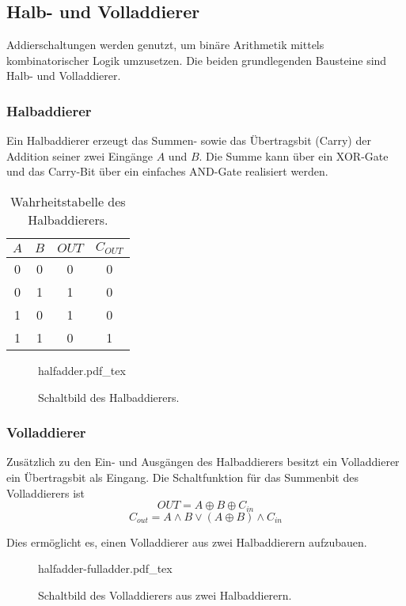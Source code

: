 \subsection{Halb- und Volladdierer}

Addierschaltungen werden genutzt, um binäre Arithmetik mittels kombinatorischer Logik umzusetzen. Die beiden grundlegenden Bausteine sind Halb- und Volladdierer.

\subsubsection{Halbaddierer}
Ein Halbaddierer erzeugt das Summen- sowie das Übertragsbit (Carry) der Addition seiner zwei Eingänge $A$ und $B$.
Die Summe kann über ein XOR-Gate und das Carry-Bit über ein einfaches AND-Gate realisiert werden.


\begin{table}[H]
\centering
 \begin{tabular}{|c|c|c|c|}
  \hline
    $A$ & $B$ & $OUT$ & $C_{OUT}$ \\\hline
    0 & 0 & 0 & 0\\\hline
    0 & 1 & 1 & 0\\\hline
    1 & 0 & 1 & 0\\\hline
    1 & 1 & 0 & 1\\\hline
  \end{tabular}
  \caption{Wahrheitstabelle des Halbaddierers.}
\end{table}

\begin{figure}[H]
  \def\svgwidth{0.382\textwidth}\normalsize
  \begin{center}
     {halfadder.pdf_tex}
  \end{center}
  \caption{Schaltbild des Halbaddierers.}
  \label{fig:halfadder}
\end{figure}


\subsubsection{Volladdierer}
Zusätzlich zu den Ein- und Ausgängen des Halbaddierers besitzt ein Volladdierer ein Übertragsbit als Eingang. Die Schaltfunktion für das Summenbit des Volladdierers ist
\[
  OUT = A \oplus B \oplus C_{in}
\]
\[
  C_{out} = A \land B \lor (A \oplus B) \land C_{in}
\]

Dies ermöglicht es, einen Volladdierer aus zwei Halbaddierern aufzubauen.

\begin{figure}[H]
  \def\svgwidth{\textwidth}\normalsize
  \begin{center}
     {halfadder-fulladder.pdf_tex}
  \end{center}
  \caption{Schaltbild des Volladdierers aus zwei Halbaddierern.}
  \label{fig:fulladder-1}
\end{figure}
